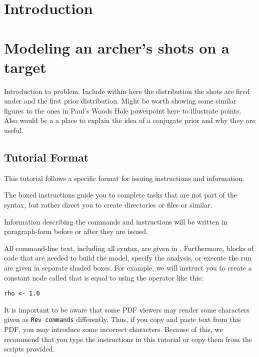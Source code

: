 \bigskip
\section{Introduction}\label{sect:Introduction}




\newpage
\section{Modeling an archer's shots on a target}\label{sect:Exercise}

Introduction to problem. Include within here the distribution the shots are fired under and the first prior distribution. Might be worth showing some similar figures to the ones in Paul's Woods Hole powerpoint here to illustrate points. Also would be a a place to explain the idea of a conjugate prior and why they are useful. 

\medskip
\subsection{Tutorial Format}\label{subsect:Exercise-Format}

This tutorial follows a specific format for issuing instructions and information.

{\begin{framed}
The boxed instructions guide you to complete tasks that are not part of the \RevBayes syntax, but rather direct you to create directories or files or similar.
\end{framed}}

Information describing the commands and instructions will be written in paragraph-form before or after they are issued.

All command-line text, including all \Rev syntax, are given in . 
Furthermore, blocks of \Rev code that are needed to build the model, specify the analysis, or execute the run are given in separate shaded boxes.
For example, we will instruct you to create a constant node called  that is equal to  using the \cl{<-} operator like this:
{\tt \begin{snugshade*}
\begin{lstlisting}
rho <- 1.0
\end{lstlisting}
\end{snugshade*}}

It is important to be aware that some PDF viewers may render some characters given as \colorbox{shadecolor}{\tt{Rev commands}} differently. 
Thus, if you copy and paste text from this PDF, you may introduce some incorrect characters. 
Because of this, we recommend that you type the instructions in this tutorial or copy them from the scripts provided. 



